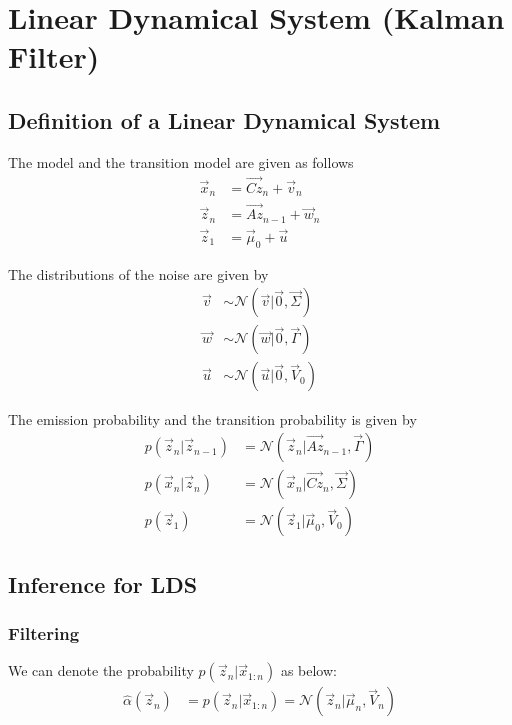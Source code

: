 \documentclass[12pt,twoside]{article}
\begin{document}
\section{Linear Dynamical System (Kalman Filter)}

\subsection{Definition of a Linear Dynamical System}
The model and the transition model are given as follows
\begin{align*}
	\vec{x}_n 		 	&= \vec{Cz}_n +\vec{v}_n \\	
	\vec{z}_n 			&= \vec{Az}_{n-1} + \vec{w}_n\\
	\vec{z}_1			&= \vec{\mu}_0 + \vec{u}
\end{align*}

The distributions of the noise are given by
\begin{align*}
	\vec{v}				& \sim \mathcal{N}(\vec{v} \vert \vec{0},\vec{\Sigma}) \\
	\vec{w}				&\sim \mathcal{N}(\vec{w} \vert \vec{0},\vec{\Gamma}) \\
	\vec{u}				& \sim \mathcal{N}(\vec{u} \vert \vec{0}, \vec{V}_0)
\end{align*}

The emission probability and the transition probability is given by
\begin{align*}
	p(\vec{z}_n \vert \vec{z}_{n-1})		& = \mathcal{N} (\vec{z}_n \vert \vec{Az}_{n-1}, \vec{\Gamma})\\
	p(\vec{x}_n \vert \vec{z}_n)				& = \mathcal{N} (\vec{x}_n \vert \vec{Cz}_n, \vec{\Sigma}) \\
	p(\vec{z}_1) 									& = \mathcal{N} (\vec{z}_1 \vert \vec{\mu}_0, \vec{V}_0)
\end{align*}

\subsection{Inference for LDS}
\subsubsection{Filtering}

We can denote the probability $ p(\vec{z}_n \vert \vec{x}_{1:n})$ as below:
\begin{align*}
	\hat{\alpha} (\vec{z}_n)	& = p(\vec{z}_n \vert \vec{x}_{1:n}) = \mathcal{N} (\vec{z}_n\vert \vec{\mu}_n, \vec{V}_n)
\end{align*}
\end{document}
